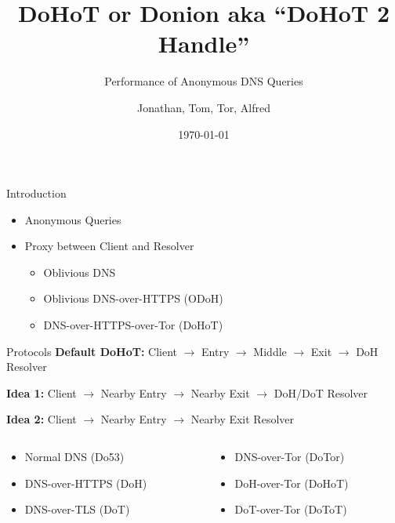 \documentclass[xcolor=x11names,dvipsnames,aspectratio=169]{beamer}
\title{\huge DoHoT or Donion aka ``DoHoT 2 Handle''}
\subtitle{Performance of Anonymous DNS Queries}
\author{\small Jonathan, Tom, Tor, Alfred}
\date{\today}
\begin{document}
    \setcounter{showProgressBar}{0}
	\setcounter{showSlideNumbers}{0}

	\frame{\titlepage}

	\setcounter{framenumber}{0}
	\setcounter{showProgressBar}{1}
	\setcounter{showSlideNumbers}{1}

    \begin{frame}{Introduction}
        \begin{itemize}
            \item Anonymous Queries
            \item Proxy between Client and Resolver
            \begin{itemize}
                \item Oblivious DNS
                \item Oblivious DNS-over-HTTPS (ODoH)
                \item DNS-over-HTTPS-over-Tor (DoHoT)
            \end{itemize}
        \end{itemize}
    \end{frame}

    \begin{frame}{Protocols}
        \textbf{Default DoHoT:}
        Client $\rightarrow$
        Entry $\rightarrow$
        Middle $\rightarrow$
        Exit $\rightarrow$
        DoH Resolver

        \vspace{1em}
        \textbf{Idea 1:}
        Client $\rightarrow$
        Nearby Entry $\rightarrow$
        Nearby Exit $\rightarrow$
        DoH/DoT Resolver

        \vspace{1em}
        \textbf{Idea 2:}
        Client $\rightarrow$
        Nearby Entry $\rightarrow$
        Nearby Exit Resolver

        \vspace{2em}

        \begin{columns}
            \begin{column}{.5\textwidth}
                \begin{itemize}
                    \item Normal DNS (Do53)
                    \item DNS-over-HTTPS (DoH)
                    \item DNS-over-TLS (DoT)
                \end{itemize}
            \end{column}
            \begin{column}{.5\textwidth}
                \begin{itemize}
                    \item DNS-over-Tor (DoTor)
                    \item DoH-over-Tor (DoHoT)
                    \item DoT-over-Tor (DoToT)
                \end{itemize}
            \end{column}
        \end{columns}
    \end{frame}
\end{document}
